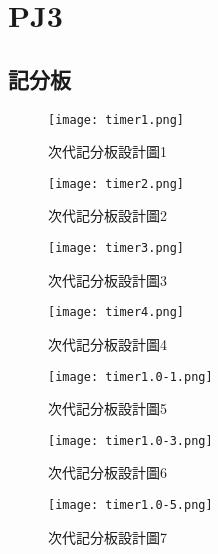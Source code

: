 \chapter{PJ3}


\section{記分板}





\begin{figure}
  \centering
  \texttt{[image: timer1.png]}
  \caption{次代記分板設計圖1}
  
\end{figure}



\begin{figure}
  \centering
  \texttt{[image: timer2.png]}
  \caption{次代記分板設計圖2}
  \label{fig:example}
\end{figure}


\begin{figure}
  \centering
  \texttt{[image: timer3.png]}
  \caption{次代記分板設計圖3}
  \label{fig:example}
\end{figure}



\begin{figure}
  \centering
  \texttt{[image: timer4.png]}
  \caption{次代記分板設計圖4}
  \label{fig:example}
\end{figure}



\begin{figure}
  \centering
  \texttt{[image: timer1.0-1.png]}
  \caption{次代記分板設計圖5}
  \label{fig:example}
\end{figure}







\begin{figure}
  \centering
  \texttt{[image: timer1.0-3.png]}
  \caption{次代記分板設計圖6}
  \label{fig:example}
\end{figure}



\begin{figure}
  \centering
  \texttt{[image: timer1.0-5.png]}
  \caption{次代記分板設計圖7}
  \label{fig:example}
\end{figure}



